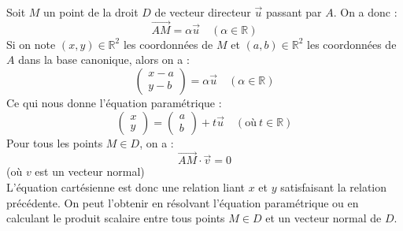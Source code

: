 \documentclass[a4paper, titlepage]{article}
\begin{document}
	Soit $M$ un point de la droit $D$ de vecteur directeur $\vec u$ passant par $A$. On a donc :
	$$ \overrightarrow{AM} = \alpha\vec u\quad(\alpha\in\mathbb{R}) $$
	Si on note $(x,y)\in\mathbb{R}^2$ les coordonnées de $M$ et $(a,b)\in\mathbb{R}^2$ les coordonnées de $A$ dans la base canonique, alors on a :
	$$ \begin{pmatrix} x-a\\y-b \end{pmatrix} = \alpha\vec u\quad(\alpha\in\mathbb{R}) $$
	Ce qui nous donne l'équation paramétrique :
	$$ \begin{pmatrix} x\\y \end{pmatrix} = \begin{pmatrix} a\\b \end{pmatrix}+t\vec u\quad(\text{où}~t\in\mathbb{R}) $$
	Pour tous les points $M\in D$, on a :
	$$ \overrightarrow{AM}\cdot\vec v = 0 $$
	(où $v$ est un vecteur normal)\\
	L'équation cartésienne est donc une relation liant $x$ et $y$ satisfaisant la relation précédente. On peut l'obtenir en résolvant l'équation paramétrique ou en calculant le produit scalaire entre tous points $M\in D$ et un vecteur normal de $D$.
\end{document}
